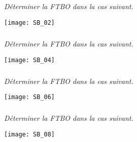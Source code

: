 \setcounter{exo}{0}
\subparagraph{}\textit{Déterminer la FTBO dans la cas suivant.}
\begin{center}
\texttt{[image: SB\_02]}
\end{center}

\subparagraph{}\textit{Déterminer la FTBO dans la cas suivant.}
\begin{center}
\texttt{[image: SB\_04]}
\end{center}

\subparagraph{}\textit{Déterminer la FTBO dans la cas suivant.}
\begin{center}
\texttt{[image: SB\_06]}
\end{center}

\subparagraph{}\textit{Déterminer la FTBO dans la cas suivant.}
\begin{center}
\texttt{[image: SB\_08]}
\end{center}